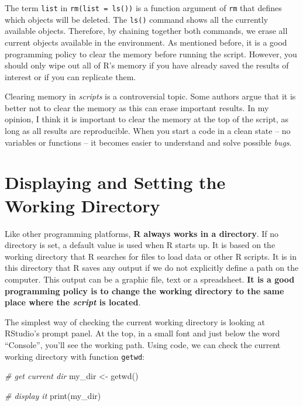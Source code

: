 \documentclass[
  12pt,
]{book}
\newenvironment{Shaded}{\begin{snugshade}}{\end{snugshade}}
\newcommand{\CommentTok}[1]{\textcolor[rgb]{0.37,0.37,0.37}{\textit{#1}}}
\newcommand{\FunctionTok}[1]{\textcolor[rgb]{0,0,0}{#1}}
\newcommand{\NormalTok}[1]{#1}
\newcommand{\OtherTok}[1]{\textcolor[rgb]{0.37,0.37,0.37}{#1}}
\newenvironment{rmdcaution}
{\begin{cautionblock}
		
	} {\end{cautionblock}}
\begin{document}
The term \texttt{list} in \texttt{rm(list\ =\ ls())} is a function argument of \texttt{rm} that defines which objects will be deleted. The \texttt{ls()} command shows all the currently available objects. Therefore, by chaining together both commands, we erase all current objects available in the environment. As mentioned before, it is a good programming policy to clear the memory before running the script. However, you should only wipe out all of R's memory if you have already saved the results of interest or if you can replicate them.

\begin{rmdcaution}
Clearing memory in \emph{scripts} is a controversial topic. Some authors
argue that it is better not to clear the memory as this can erase
important results. In my opinion, I think it is important to clear the
memory at the top of the script, as long as all results are
reproducible. When you start a code in a clean state -- no variables or
functions -- it becomes easier to understand and solve possible
\emph{bugs}.
\end{rmdcaution}

\hypertarget{displaying-and-setting-the-working-directory}{%
\section{Displaying and Setting the Working Directory}\label{displaying-and-setting-the-working-directory}}

Like other programming platforms, \textbf{R always works in a directory}. If no directory is set, a default value is used when R starts up. It is based on the working directory that R searches for files to load data or other R scripts. It is in this directory that R saves any output if we do not explicitly define a path on the computer. This output can be a graphic file, text or a spreadsheet. \textbf{It is a good programming policy is to change the working directory to the same place where the \emph{script} is located}.

The simplest way of checking the current working directory is looking at RStudio's prompt panel. At the top, in a small font and just below the word ``Console'', you'll see the working path. Using code, we can check the current working directory with function \texttt{getwd}: 

\begin{Shaded}
\begin{Highlighting}[]
\CommentTok{\# get current dir}
\NormalTok{my\_dir }\OtherTok{\textless{}{-}} \FunctionTok{getwd}\NormalTok{()}

\CommentTok{\# display it}
\FunctionTok{print}\NormalTok{(my\_dir)}
\end{Highlighting}
\end{Shaded}
\end{document}
